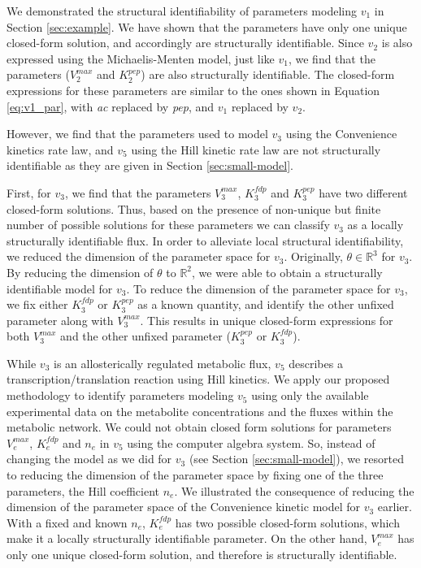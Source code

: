 \documentclass[10pt]{article}
\begin{document}
	We demonstrated the structural identifiability of parameters modeling $v_1$ in Section \ref{sec:example}. We have shown that the parameters have only one unique closed-form solution, and accordingly are structurally identifiable. Since $v_2$ is also expressed using the Michaelis-Menten model, just like $v_1$, we find that the parameters ($V_2^{max}$ and $K_2^{pep}$) are also structurally identifiable. The closed-form expressions for these parameters are similar to the ones shown in Equation \ref{eq:v1_par}, with \textit{ac} replaced by \textit{pep}, and $v_1$ replaced by $v_2$. 
	
	However, we find that the parameters used to model $v_3$ using the Convenience kinetics rate law, and $v_5$ using the Hill kinetic rate law are not structurally identifiable as they are given in Section \ref{sec:small-model}. 
	
	First, for $v_3$, we find that the parameters $V_3^{max}$, $K_3^{fdp}$ and $K_3^{pep}$ have two different closed-form solutions. Thus, based on the presence of non-unique but finite number of possible solutions for these parameters we can classify $v_3$ as a locally structurally identifiable flux. In order to alleviate local structural identifiability, we reduced the dimension of the parameter space for $v_3$. Originally, $\theta \in \mathbb{R}^3$ for $v_3$. By reducing the dimension of $\theta$ to $\mathbb{R}^2$, we were able to obtain a structurally identifiable model for $v_3$. To reduce the dimension of the parameter space for $v_3$, we fix either $K_3^{fdp}$ or $K_3^{pep}$ as a known quantity, and identify the other unfixed parameter along with $V_3^{max}$. This results in unique closed-form expressions for both $V_3^{max}$ and the other unfixed parameter ($K_3^{pep}$ or $K_3^{fdp}$).
	
	
	While $v_3$ is an allosterically regulated metabolic flux, $v_5$ describes a transcription/translation reaction using Hill kinetics. We apply our proposed methodology to identify parameters modeling $v_5$ using only the available experimental data on the metabolite concentrations and the fluxes within the metabolic network. We could not obtain closed form solutions for parameters $V_e^{max}$, $K_e^{fdp}$ and $n_e$ in $v_5$ using the computer algebra system. So, instead of changing the model as we did for $v_3$ (see Section \ref{sec:small-model}), we resorted to reducing the dimension of the parameter space by fixing one of the three parameters, the Hill coefficient $n_e$. We illustrated the consequence of reducing the dimension of the parameter space of the Convenience kinetic model for $v_3$ earlier. With a fixed and known $n_e$, $K_e^{fdp}$ has two possible closed-form solutions, which make it a locally structurally identifiable parameter. On the other hand, $V_e^{max}$ has only one unique closed-form solution, and therefore is structurally identifiable. 
	
\end{document}
